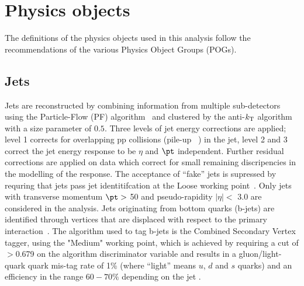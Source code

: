 \clearpage
\section{Physics objects\label{sec:reconstruction}}

The definitions of the physics objects used in this analysis follow
the recommendations of the various Physics Object Groups (POGs).

\subsection{Jets}

Jets are reconstructed by combining information from multiple
sub-detectors using the Particle-Flow (PF) algorithm~\cite{PAS-PFT-09-001} 
and clustered by the anti-$k_{\rm T}$ algorithm~\cite{antikt} with
a size parameter of $0.5$. Three levels of jet energy corrections are 
applied; level 1 corrects for overlapping pp collisions 
(pile-up ~\cite{Cacciari2008119,1126-6708-2008-04-005}) in the jet, 
level 2 and 3 correct the jet energy response to be $\eta$ and $\pt$ independent.  
Further residual corrections are applied on data which correct for 
small remaining discripencies in the modelling of the response. The acceptance of
``fake'' jets is supressed by requring that jets pass jet identitifcation at the 
Loose working point~\cite{ref:jet-id}. Only jets with transverse momentum $\pt >$ 50\gev 
and pseudo-rapidity $|\eta| <$ 3.0 are considered in the analysis. 
Jets originating from bottom quarks (b-jets) are identified 
through vertices that are displaced with respect to the primary 
interaction~\cite{CMS-PAS-BTV-12-001}. The algorithm used to tag b-jets 
is the Combined Secondary Vertex tagger, using the "Medium" working point, 
which is achieved by requiring a cut of $>$0.679 on the algorithm discriminator 
variable and results in a gluon/light-quark quark mis-tag rate of 1\% 
(where ``light'' means $u$, $d$ and $s$ quarks) and an efficiency in the 
range $60-70\%$ depending on the jet \pt. 


